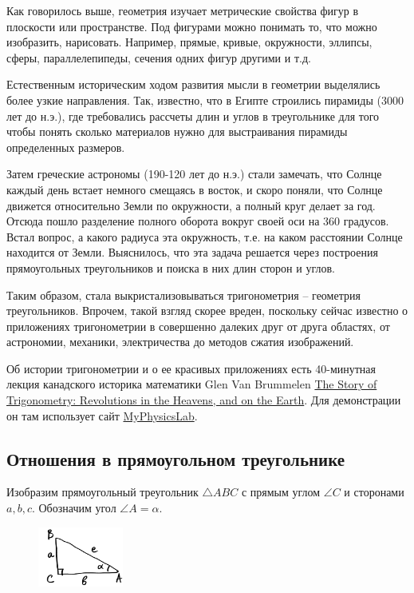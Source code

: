 \documentclass[a4paper,12pt]{article}
\newcounter{th-counter}
\begin{document}


Как говорилось выше, геометрия изучает метрические свойства фигур в плоскости или пространстве. Под фигурами можно понимать то, что можно изобразить, нарисовать. Например, прямые, кривые, окружности, эллипсы, сферы, параллелепипеды, сечения одних фигур другими и т.д.

Естественным историческим ходом развития мысли в геометрии выделялись более узкие направления. Так, известно, что в Египте строились пирамиды (3000 лет до н.э.), где требовались рассчеты длин и углов в треугольнике для того чтобы понять сколько материалов нужно для выстраивания пирамиды определенных размеров.

Затем греческие астрономы (190-120 лет до н.э.) стали замечать, что Солнце каждый день встает немного смещаясь в восток, и скоро поняли, что Солнце движется относительно Земли по окружности, а полный круг делает за год. Отсюда пошло разделение полного оборота вокруг своей оси на 360 градусов. Встал вопрос, а какого радиуса эта окружность, т.е. на каком расстоянии Солнце находится от Земли. Выяснилось, что эта задача решается через построения прямоугольных треугольников и поиска в них длин сторон и углов.

Таким образом, стала выкристализовываться тригонометрия -- геометрия треугольников. Впрочем, такой взгляд скорее вреден, поскольку сейчас известно о приложениях тригонометрии в совершенно далеких друг от друга областях, от астрономии, механики, электричества до методов сжатия изображений.

Об истории тригонометрии и о ее красивых приложениях есть 40-минутная лекция канадского историка математики Glen Van Brummelen \href{https://youtu.be/eurWRYY82AQ?si=FBo6oCkqklM5nc1_}{The Story of Trigonometry: Revolutions in the Heavens, and on the Earth}. Для демонстрации он там использует сайт \href{https://www.myphysicslab.com/}{MyPhysicsLab}.

\subsection*{Отношения в прямоугольном треугольнике}
Изобразим прямоугольный треугольник $\triangle ABC$ с прямым углом $\angle C$ и сторонами $a,b,c$. Обозначим угол $\angle A = \alpha$.
\begin{figure}[H]
    \centering
    \includegraphics[width=0.25\textwidth]{pictures/pct_triangle_trigonometry.jpg}
\end{figure}
\end{document}
